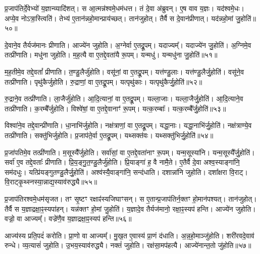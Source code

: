 प्र॒जा\-प॑तिर्दे॒वेभ्यो॑ य॒ज्ञान्व्यादि॑शत्।
स आ॒त्मन्न॑श्वमे॒धम॑धत्त।
तं दे॒वा अ॑ब्रुवन्।
ए॒ष वाव य॒ज्ञः।
यद॑श्वमे॒धः।
अप्ये॒व नोऽत्रा॒स्त्विति॑।
तेभ्य॑ ए॒तान॑न्नहो॒मान्प्राय॑च्छत्।
तान॑जुहोत्।
तैर्वै स दे॒वान॑प्रीणात्।
यद॑न्नहो॒मां जु॒होति॑॥५०॥

दे॒वाने॒व तैर्यज॑मानः प्रीणाति।
आज्ये॑न जुहोति।
अ॒ग्नेर्वा ए॒तद्रू॒पम्।
यदाज्यम्᳚।
यदाज्ये॑न जु॒होति॑।
अ॒ग्निमे॒व तत्प्री॑णाति।
मधु॑ना जुहोति।
म॒ह॒त्यै वा ए॒तद्दे॒वता॑यै रू॒पम्।
यन्मधु॑।
यन्मधु॑ना जु॒होति॑॥५१॥

म॒ह॒तीमे॒व तद्दे॒वतां᳚ प्रीणाति।
त॒ण्डु॒लैर्जु॑होति।
वसू॑नां॒ वा ए॒तद्रू॒पम्।
यत्त॑ण्डु॒लाः।
यत्त॑ण्डु॒लैर्जु॒होति॑।
वसू॑ने॒व तत्प्री॑णाति।
पृथु॑कैर्जुहोति।
रु॒द्राणां॒ वा ए॒तद्रू॒पम्।
यत्पृथु॑काः।
यत्पृथु॑कैर्जु॒होति॑॥५२॥

रु॒द्राने॒व तत्प्री॑णाति।
ला॒जैर्जु॑होति।
आ॒दि॒त्यानां॒ वा ए॒तद्रू॒पम्।
यल्ला॒जाः।
यल्ला॒जैर्जु॒होति॑।
आ॒दि॒त्याने॒व तत्प्री॑णाति।
क॒रम्बै᳚र्जुहोति।
विश्वे॑षां॒ वा ए॒तद्दे॒वानाꣳ॑ रू॒पम्।
यत्क॒रम्बाः᳚।
यत्क॒रम्बै᳚र्जु॒होति॑॥५३॥

विश्वा॑ने॒व तद्दे॒वान्प्री॑णाति।
धा॒नाभि॑र्जुहोति।
नक्ष॑त्राणां॒ वा ए॒तद्रू॒पम्।
यद्धा॒नाः।
यद्धा॒नाभि॑र्जु॒होति॑।
नक्ष॑त्राण्ये॒व तत्प्री॑णाति।
सक्तु॑भिर्जुहोति।
प्र॒जा\-प॑ते॒र्वा ए॒तद्रू॒पम्।
यथ्सक्त॑वः।
यथ्सक्तु॑भिर्जु॒होति॑॥५४॥

प्र॒जा॑पतिमे॒व तत्प्री॑णाति।
म॒सूस्यै᳚र्जुहोति।
सर्वा॑सां॒ वा ए॒तद्दे॒वता॑नाꣳ रू॒पम्।
यन्म॒सूस्या॑नि।
यन्म॒सूस्यै᳚र्जु॒होति॑।
सर्वा॑ ए॒व तद्दे॒वताः᳚ प्रीणाति।
प्रि॒य॒ङ्गु॒त॒ण्डु॒लैर्जु॑होति।
प्रि॒याङ्गा॑ ह॒ वै नामै॒ते।
ए॒तैर्वै दे॒वा अश्व॒स्याङ्गा॑नि॒ सम॑दधुः।
यत्प्रि॑यङ्गुतण्डु॒लैर्जु॒होति॑।
अश्व॑स्यै॒वाङ्गा॑नि॒ सन्द॑धाति।
दशान्ना॑नि जुहोति।
दशा᳚क्षरा वि॒राट्।
वि॒राट्कृ॒थ्स्नस्या॒न्नाद्य॒स्याव॑रुद्ध्यै॥५५॥\anuvakamend[जु॒होति॒ मधु॑ना जु॒होति॒ पृथु॑कैर्जु॒होति॑ क॒रम्बै᳚र्जु॒होति॒ सक्तु॑भिर्जु॒होति॑ प्रियङ्गुतण्डु॒लैर्जु॒होति॑ च॒त्वारि॑ च (अ॒न्नहो॒मानाऽऽज्ये॑ना॒ग्नेर्मधु॑ना तण़्डु॒लैः पृथु॑कैर्ला॒जैः क॒रम्बै᳚र्धा॒नाभिः॒ सक्तु॑भिर्म॒सूस्यैः᳚ प्रियङ्गुतण्डु॒लैर्द॒शान्ना॑नि॒ द्वाद॑श।
)]

प्र॒जा\-प॑तिरश्वमे॒धम॑\-सृजत।
तꣳ सृ॒ष्टꣳ रक्षाꣴ॑स्यजिघाꣳसन्।
स ए॒तान्प्र॒जा\-प॑तिर्न॒क्तꣳ हो॒मान॑पश्यत्।
तान॑जुहोत्।
तैर्वै स य॒ज्ञाद्रक्षा॒ꣴ॒स्यपा॑हन्।
यन्न॑क्तꣳ हो॒मां जु॒होति॑।
य॒ज्ञादे॒व तैर्यज॑मानो॒ रक्षा॒ꣴ॒स्यप॑ हन्ति।
आज्ये॑न जुहोति।
वज्रो॒ वा आज्यम्᳚।
वज्रे॑णै॒व य॒ज्ञाद्रक्षा॒ꣴ॒स्यप॑ हन्ति॥५६॥

आज्य॑स्य प्रति॒पदं॑ करोति।
प्रा॒णो वा आज्यम्᳚।
मु॒ख॒त ए॒वास्य॑ प्रा॒णं द॑धाति।
अ॒न्न॒हो॒माञ्जु॑होति।
शरी॑रवदे॒वाव॑ रुन्धे।
व्य॒त्यासं॑ जुहोति।
उ॒भय॒स्याव॑रुद्ध्यै।
नक्तं॑ जुहोति।
रक्ष॑सा॒मप॑हत्यै।
आज्ये॑नान्त॒तो जु॑होति॥५७॥

